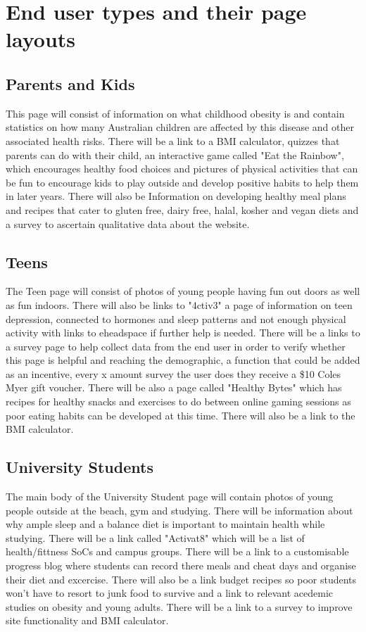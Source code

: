 \documentclass[letterpaper,12pt]{article}
\begin{document}
\section{End user types and their page layouts}
\subsection{Parents and Kids}

This page will consist of information on what childhood obesity is and contain statistics on how many Australian children are affected by this disease and other associated health risks. There will be a link to a BMI calculator, quizzes that parents can do with their child, an interactive game called "Eat the Rainbow", which encourages healthy food choices and pictures of physical activities that can be fun to encourage kids to play outside and develop positive habits to help them in later years. There will also be Information on developing healthy meal plans and recipes that cater to gluten free, dairy free, halal, kosher and vegan diets and a survey to ascertain qualitative data about the website.

\subsection{Teens}

The Teen page will consist of photos of young people having fun out doors as well as fun indoors. There will also be links to "4ctiv3" a page of information on teen depression, connected to hormones and sleep patterns and not enough physical activity with links to eheadspace if further help is needed. There will be a links to a survey page to help collect data from the end user in order to verify whether this page is helpful and reaching the demographic, a function that could be added as an incentive, every x amount survey the user does they receive a \$10 Coles Myer gift voucher. There will be also a page called "Healthy Bytes" which has recipes for healthy snacks and exercises to do between online gaming sessions as poor eating habits can be developed at this time. There will also be a link to the BMI calculator.

\subsection{University Students}

The main body of the University Student page will contain photos of young people outside at the beach, gym and studying. There will be information about why ample sleep and a balance diet is important to maintain health while studying. There will be a link called "Activat8" which will be a list of health/fittness SoCs and campus groups. There will be a link to a customisable progress blog where students can record there meals and cheat days and organise their diet and excercise. There will also be a link budget recipes so poor students won't have to resort to junk food to survive and a link to relevant acedemic studies on obesity and young adults. There will be a link to a survey to improve site functionality and BMI calculator.
\end{document}
